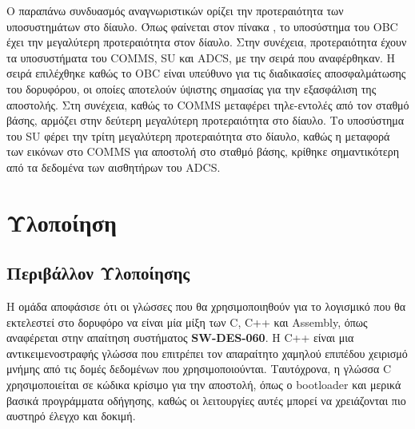 \documentclass[a4paper,nobib,justified]{tufte-book}
\begin{document}
\FloatBarrier


Ο παραπάνω συνδυασμός αναγνωριστικών ορίζει την προτεραιότητα των υποσυστημάτων στο δίαυλο. Όπως φαίνεται στον πίνακα , το υποσύστημα του OBC έχει την μεγαλύτερη προτεραιότητα στον δίαυλο. Στην συνέχεια, προτεραιότητα έχουν τα υποσυστήματα του COMMS, SU και ADCS, με την σειρά που αναφέρθηκαν. Η σειρά επιλέχθηκε καθώς το OBC είναι υπεύθυνο για τις διαδικασίες αποσφαλμάτωσης του δορυφόρου, οι οποίες αποτελούν ύψιστης σημασίας για την εξασφάλιση της αποστολής. Στη συνέχεια, καθώς το COMMS μεταφέρει τηλε-εντολές από τον σταθμό βάσης, αρμόζει στην δεύτερη μεγαλύτερη προτεραιότητα στο δίαυλο. Το υποσύστημα του SU φέρει την τρίτη μεγαλύτερη προτεραιότητα στο δίαυλο, καθώς η μεταφορά των εικόνων στο COMMS για αποστολή στο σταθμό βάσης, κρίθηκε σημαντικότερη από τα δεδομένα των αισθητήρων του ADCS.

\clearpage
\chapter{Υλοποίηση}
\label{chap:implementation}
\section{Περιβάλλον Υλοποίησης}


Η ομάδα αποφάσισε ότι οι γλώσσες που θα χρησιμοποιηθούν για το λογισμικό που θα εκτελεστεί στο δορυφόρο να είναι μία μίξη των C, C++ και Assembly, όπως αναφέρεται στην απαίτηση συστήματος \textbf{SW-DES-060}. Η C++ είναι μια αντικειμενοστραφής γλώσσα που επιτρέπει τον απαραίτητο χαμηλού επιπέδου χειρισμό μνήμης από τις δομές δεδομένων που χρησιμοποιούνται. Ταυτόχρονα, η γλώσσα C χρησιμοποιείται σε κώδικα κρίσιμο για την αποστολή, όπως ο bootloader και μερικά βασικά προγράμματα οδήγησης, καθώς οι λειτουργίες αυτές μπορεί να χρειάζονται πιο αυστηρό έλεγχο και δοκιμή.

\end{document}
